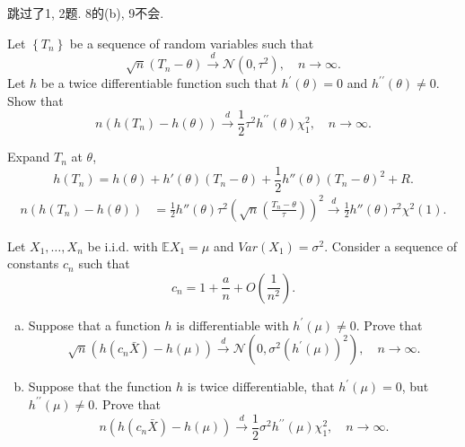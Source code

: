 \chapter{}

跳过了1, 2题. 8的(b), 9不会. 



\begin{ex}
    Let \(\left\{T_{n}\right\}\) be a sequence of random variables such that
    \[
        \sqrt{n}\left(T_{n}-\theta\right) \stackrel{d}{\rightarrow} \mathcal{N}\left(0, \tau^{2}\right), \quad n \rightarrow \infty. 
    \]
    Let \(h\) be a twice differentiable function such that \(h^{\prime}(\theta)=0\) and \(h^{\prime \prime}(\theta) \neq 0\). Show that
    \[
        n\left(h\left(T_{n}\right)-h(\theta)\right) \stackrel{d}{\rightarrow} \frac{1}{2} \tau^{2} h^{\prime \prime}(\theta) \chi_{1}^{2}, \quad n \rightarrow \infty. 
    \]
\end{ex}

\begin{solution}
    Expand $T_n$ at $\theta$, 
    \[
            h(T_n)=h(\theta)+h'(\theta)(T_n-\theta)+\frac{1}{2}h''(\theta)(T_n-\theta)^2+R. 
    \]
    \[
        \begin{aligned}
            n(h(T_n)-h(\theta))&=\frac{1}{2}h''(\theta)\tau^2\left(\sqrt{n}\left(\frac{T_{n}-\theta}{\tau}\right)\right)^2\stackrel{d}{\rightarrow}\frac{1}{2}h''(\theta)\tau^2\chi^2(1). 
        \end{aligned}
    \]
\end{solution}

\begin{ex}
    Let \(X_{1}, \ldots, X_{n}\) be i.i.d. with \(\mathbb{E} X_{1}=\mu\) and \(Var\left(X_{1}\right)=\sigma^{2}\). Consider a sequence of constants \(c_{n}\) such that
    \[
        c_{n}=1+\frac{a}{n}+O\left(\frac{1}{n^{2}}\right) .
    \]
    \begin{enumerate}[(a)]
        \item Suppose that a function \(h\) is differentiable with \(h^{\prime}(\mu) \neq 0\). Prove that
        \[
            \sqrt{n}\left(h\left(c_{n} \bar{X}\right)-h(\mu)\right) \stackrel{d}{\rightarrow} \mathcal{N}\left(0, \sigma^{2}\left(h^{\prime}(\mu)\right)^{2}\right), \quad n \rightarrow \infty. 
        \]
        \item Suppose that the function \(h\) is twice differentiable, that \(h^{\prime}(\mu)=0\), but \(h^{\prime \prime}(\mu) \neq 0\). Prove that
        \[
            n\left(h\left(c_{n} \bar{X}\right)-h(\mu)\right) \stackrel{d}{\rightarrow} \frac{1}{2} \sigma^{2} h^{\prime \prime}(\mu) \chi_{1}^{2}, \quad n \rightarrow \infty. 
        \]
    \end{enumerate}
\end{ex}

